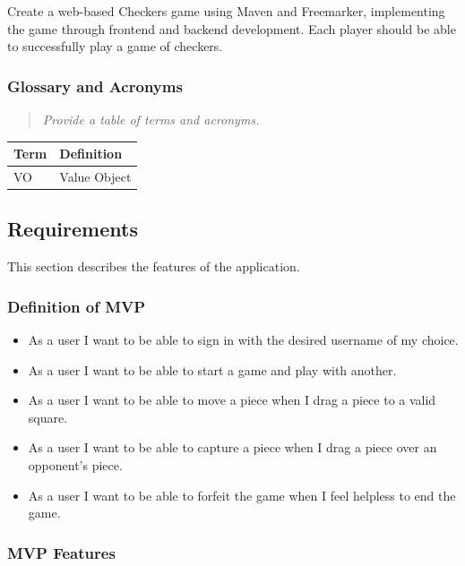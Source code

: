 Create a web-based Checkers game using Maven and Freemarker,
implementing the game through frontend and backend development. Each
player should be able to successfully play a game of checkers.

\hypertarget{glossary-and-acronyms}{%
\subsubsection{Glossary and Acronyms}\label{glossary-and-acronyms}}

\begin{quote}
\emph{Provide a table of terms and acronyms.}
\end{quote}

\begin{longtable}[]{@{}ll@{}}
\toprule
Term & Definition \\
\midrule
\endhead
VO & Value Object \\
\bottomrule
\end{longtable}

\hypertarget{requirements}{%
\subsection{Requirements}\label{requirements}}

This section describes the features of the application.

\hypertarget{definition-of-mvp}{%
\subsubsection{Definition of MVP}\label{definition-of-mvp}}

\begin{itemize}
\tightlist
\item
  As a user I want to be able to sign in with the desired username of my
  choice.
\item
  As a user I want to be able to start a game and play with another.
\item
  As a user I want to be able to move a piece when I drag a piece to a
  valid square.
\item
  As a user I want to be able to capture a piece when I drag a piece
  over an opponent's piece.
\item
  As a user I want to be able to forfeit the game when I feel helpless
  to end the game.
\end{itemize}

\hypertarget{mvp-features}{%
\subsubsection{MVP Features}\label{mvp-features}}

